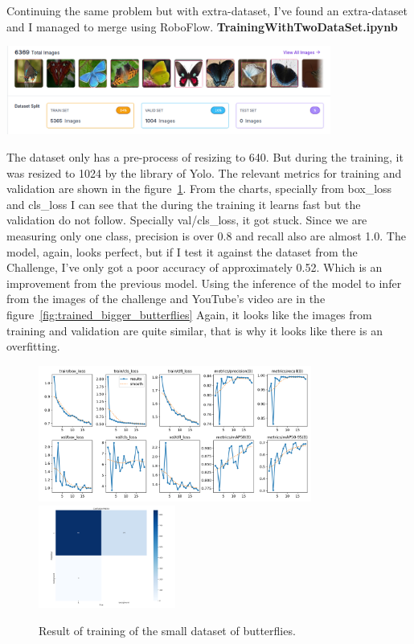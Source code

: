 \documentclass{cpsc202}
\begin{document}
    \newpage
    Continuing the same problem but with extra-dataset, I've found an extra-dataset and I managed to merge using RoboFlow.
    \Large\textbf{TrainingWithTwoDataSet.ipynb}
    \begin{center}
        \includegraphics[width=0.8\textwidth]{trained_bigger_butterflies/dataset_enhanced}
    \end{center}
    The dataset only has a pre-process of resizing to 640.
    But during the training, it was resized to 1024 by the library of Yolo.
    The relevant metrics for training and validation are shown in the figure~\ref{fig:results-big}.
    From the charts, specially from box\_loss and cls\_loss I can see that the during the training it learns fast but the validation do not follow.
    Specially val/cls\_loss, it got stuck.
    Since we are measuring only one class, precision is over 0.8 and recall also are almost 1.0.
    The model, again,  looks perfect, but if I test it against the dataset from the Challenge, I've only got a poor accuracy of approximately 0.52.
    Which is an improvement from the previous model.
    Using the inference of the model to infer from the images of the challenge and YouTube's video are in the figure~\ref{fig:trained_bigger_butterflies}
    Again, it looks like the images from training and validation are quite similar, that is why it looks like there is an overfitting.
    \begin{figure}
        \begin{center}
            \includegraphics[width=0.8\textwidth]{trained_bigger_butterflies/results}
            \includegraphics[width=0.4\textwidth]{trained_bigger_butterflies/confusion_matrix}
        \end{center}
        \caption{Result of training of the small dataset of butterflies.}
        \label{fig:results-big}
    \end{figure}
\end{document}
